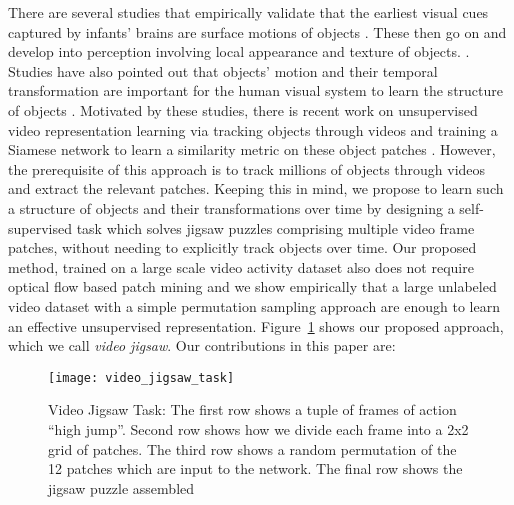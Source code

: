\documentclass[10pt,twocolumn,letterpaper]{article}
\begin{document}
There are several studies that empirically validate that the earliest visual cues captured by infants' brains are surface motions of objects \cite{spelke1990principles}. These then go on and develop into perception involving local appearance and texture of objects. \cite{spelke1990principles}. Studies have also pointed out that objects' motion and their temporal transformation are important for the human visual system to learn the structure of objects \cite{foldiak1991learning,wiskott2002slow}. Motivated by these studies, there is recent work on unsupervised video representation learning via tracking objects through videos and training a Siamese network to learn a similarity metric on these object patches \cite{wang2015unsupervised}. However, the prerequisite of this approach is to track millions of objects through videos and extract the relevant patches. Keeping this in mind, we propose to learn such a structure of objects and their transformations over time by designing a self-supervised task which solves jigsaw puzzles comprising multiple video frame patches, without needing to explicitly track objects over time. Our proposed method, trained on a large scale video activity dataset also does not require optical flow based patch mining and we show empirically that a large unlabeled video dataset with a simple permutation sampling approach are enough to learn an effective unsupervised representation. Figure~\ref{fig1} shows our proposed approach, which we call \textit{video jigsaw}. Our contributions in this paper are:
\vspace{-2mm}

\begin{figure}[t]
\centering
\texttt{[image: video\_jigsaw\_task]}
\caption{Video Jigsaw Task: The first row shows a tuple of frames of action ``high jump''. Second row shows how we divide each frame into a 2x2 grid of patches. The third row shows a random permutation of the 12 patches which are input to the network. The final row shows the jigsaw puzzle assembled}
\label{fig1}
\end{figure}
\end{document}
